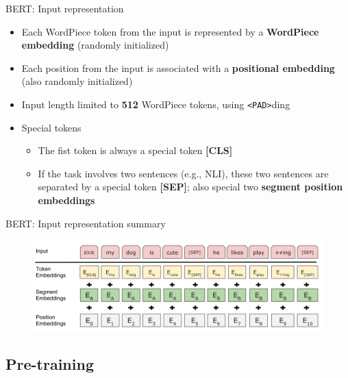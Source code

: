 \documentclass[12pt,aspectratio=169,handout]{beamer}
\begin{document}
\begin{frame}{BERT: Input representation}
	
	\begin{itemize}
		\item Each WordPiece token from the input is represented by a \textbf{WordPiece embedding} (randomly initialized)
		\item Each position from the input is associated with a \textbf{positional embedding} (also randomly initialized)
		\item Input length limited to \textbf{512} WordPiece tokens, using \texttt{<PAD>}ding
		\item Special tokens
		\begin{itemize}
			\item The fist token is always a special token \textbf{[CLS]}
			\item If the task involves two sentences (e.g., NLI), these two sentences are separated by a special token \textbf{[SEP]}; also special two \textbf{segment position embeddings} 
		\end{itemize}
		
	\end{itemize}
	
\end{frame}


\begin{frame}{BERT: Input representation summary}
	
	\begin{figure}
		\includegraphics[width=\linewidth]{img/bert-input.png}	
	\end{figure}
	
\end{frame}


\subsection{Pre-training}
\end{document}
